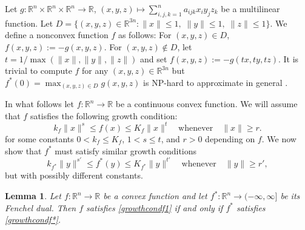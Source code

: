 \documentclass[11pt,reqno]{amsart}
\newtheorem{lemma}[theorem]{Lemma}
\theoremstyle{definition}
\theoremstyle{remark}
\begin{document}
Let $g : \mathbb{R}^n \times \mathbb{R}^n \times \mathbb{R}^n \to \mathbb{R}$, $(x,y,z) \mapsto \sum_{i,j,k=1}^n a_{ijk} x_i y_j z_k$ be a multilinear function. Let $D=\{(x,y,z) \in \mathbb{R}^{3n}: \|x\|\le 1,\; \|y \| \le 1, \; \|z \| \le 1\}$. We define a nonconvex function $f$ as follows:  For $(x,y,z)\in D$, $f(x,y,z):=-g(x,y,z)$.  For $(x,y,z)\notin D$, let $t=1/\max(\|x\|,\|y\|,\|z\|)$ and set $f(x,y,z):=-g(tx,ty,tz)$. It is trivial to compute $f$ for any $(x,y,z) \in \mathbb{R}^{3n}$ but $f^*(0)=\max_{(x,y,z)\in D} g(x,y,z)$ is NP-hard to approximate in general \cite[Theorem~10.2]{HL13}.

In what follows let $f : \mathbb{R}^n \to \mathbb{R}$ be a  continuous convex function. We will assume that $f$ satisfies the following growth condition:
\begin{equation}\label{growthcondf1}
k_f\|x\|^s\le f(x)\le K_f\|x\|^t \quad \text{whenever} \quad \|x\|\ge r.
\end{equation} 
for some constants $0<k_f \le K_f$,  $1<s \le t$, and $r > 0$ depending on $f$.
We now show that $f^*$ must satisfy similar growth conditions
\begin{equation}\label{growthcondf*}
k_{f^*}\|y\|^{s'}\le f^*(y)\le K_{f^*}\|y\|^{t'}  \quad  \text{whenever} \quad \|y\|\ge r',
\end{equation}
but with possibly different constants.  
\begin{lemma}\label{equivgrowthcond}
Let $f:\mathbb{R}^n\to \mathbb{R}$ be a convex function and let $f^*:\mathbb{R}^n\to (-\infty,\infty]$ be its Fenchel dual.
Then $f$ satisfies \eqref{growthcondf1} if and only if $f^*$ satisfies \eqref{growthcondf*}.
\end{lemma}
\end{document}
